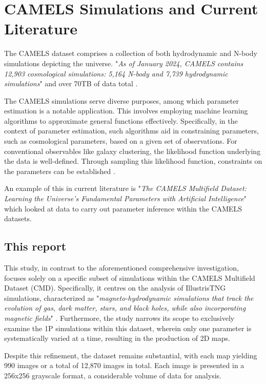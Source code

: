 \documentclass[11pt]{scrartcl}
\begin{document}
\section{CAMELS Simulations and Current Literature}
The CAMELS dataset comprises a collection of both hydrodynamic and N-body simulations depicting the universe. "\textit{As of January 2024, CAMELS contains 12,903 cosmological simulations: 5,164 N-body and 7,739 hydrodynamic simulations}" and over 70TB of data total \cite{CAMELSdocs}.

The CAMELS simulations serve diverse purposes, among which parameter estimation is a notable application. This involves employing machine learning algorithms to approximate general functions effectively. Specifically, in the context of parameter estimation, such algorithms aid in constraining parameters, such as cosmological parameters, based on a given set of observations. For conventional observables like galaxy clustering, the likelihood function underlying the data is well-defined. Through sampling this likelihood function, constraints on the parameters can be established \cite{CAMELSparams}.

An example of this in current literature is "\textit{The CAMELS Multifield Dataset: Learning the Universe’s Fundamental Parameters with Artificial Intelligence}" \cite{PARAMS} which looked at data to carry out parameter inference within the CAMELS datasets. 

\subsection{This report}
This study, in contrast to the aforementioned comprehensive investigation, focuses solely on a specific subset of simulations within the CAMELS Multifield Dataset (CMD). Specifically, it centres on the analysis of IllustrisTNG simulations, characterized as "\textit{magneto-hydrodynamic simulations that track the evolution of gas, dark matter, stars, and black holes, while also incorporating magnetic fields}" \cite{CAMELSIllustris}. Furthermore, the study narrows its scope to exclusively examine the 1P simulations within this dataset, wherein only one parameter is systematically varied at a time, resulting in the production of 2D maps.

Despite this refinement, the dataset remains substantial, with each map yielding 990 images or a total of 12,870 images in total. Each image is presented in a 256x256 grayscale format, a considerable volume of data for analysis.
\end{document}
